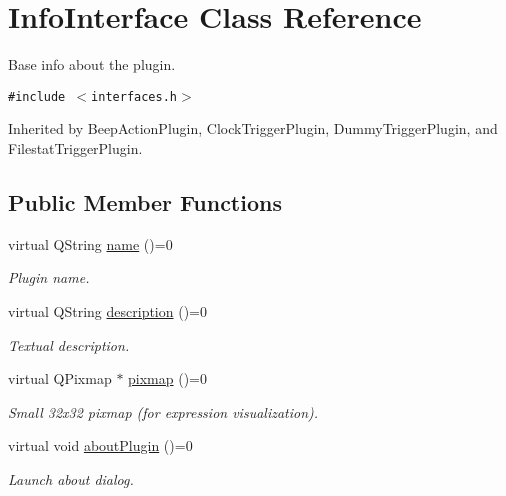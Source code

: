 \hypertarget{class_info_interface}{
\section{InfoInterface Class Reference}
\label{class_info_interface}
}
Base info about the plugin.  


{\tt \#include $<$interfaces.h$>$}

Inherited by BeepActionPlugin, ClockTriggerPlugin, DummyTriggerPlugin, and FilestatTriggerPlugin.

\subsection*{Public Member Functions}
\begin{CompactItemize}
\item 
\hypertarget{class_info_interface_b3e629d9490bfb1d3a2703712e53823f}{
virtual QString \hyperlink{class_info_interface_b3e629d9490bfb1d3a2703712e53823f}{name} ()=0}
\label{class_info_interface_b3e629d9490bfb1d3a2703712e53823f}

\begin{CompactList}\small\item\em Plugin name. \item\end{CompactList}\item 
\hypertarget{class_info_interface_31671f8b25c12c9a53e222653ae4f75b}{
virtual QString \hyperlink{class_info_interface_31671f8b25c12c9a53e222653ae4f75b}{description} ()=0}
\label{class_info_interface_31671f8b25c12c9a53e222653ae4f75b}

\begin{CompactList}\small\item\em Textual description. \item\end{CompactList}\item 
\hypertarget{class_info_interface_0d2410f50fb1628722fa410d38f3b8a2}{
virtual QPixmap $\ast$ \hyperlink{class_info_interface_0d2410f50fb1628722fa410d38f3b8a2}{pixmap} ()=0}
\label{class_info_interface_0d2410f50fb1628722fa410d38f3b8a2}

\begin{CompactList}\small\item\em Small 32x32 pixmap (for expression visualization). \item\end{CompactList}\item 
\hypertarget{class_info_interface_07dd11e800c1af741a6cc6db510f79d9}{
virtual void \hyperlink{class_info_interface_07dd11e800c1af741a6cc6db510f79d9}{aboutPlugin} ()=0}
\label{class_info_interface_07dd11e800c1af741a6cc6db510f79d9}

\begin{CompactList}\small\item\em Launch about dialog. \item\end{CompactList}\end{CompactItemize}


